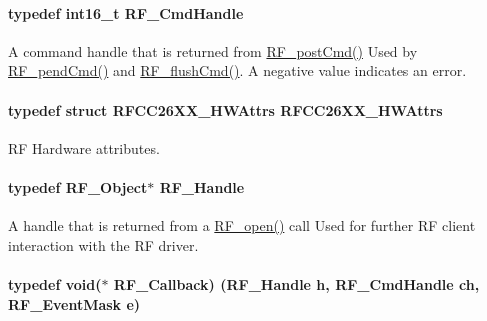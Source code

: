 \paragraph[{R\+F\+\_\+\+Cmd\+Handle}]{\setlength{\rightskip}{0pt plus 5cm}typedef int16\+\_\+t {\bf R\+F\+\_\+\+Cmd\+Handle}}\label{_r_f_8h_acab1f56c62a9fd1ad0a91a46b6da23f1}


A command handle that is returned from \hyperlink{_r_f_8h_a2b0ee444fcb74917df94eefea804ecbb}{R\+F\+\_\+post\+Cmd()} Used by \hyperlink{_r_f_8h_a91c1cb2508311f822acbc08ace568a83}{R\+F\+\_\+pend\+Cmd()} and \hyperlink{_r_f_8h_ae3ff5c614f4a63cb4e79c90f9229149a}{R\+F\+\_\+flush\+Cmd()}. A negative value indicates an error. 

\paragraph[{R\+F\+C\+C26\+X\+X\+\_\+\+H\+W\+Attrs}]{\setlength{\rightskip}{0pt plus 5cm}typedef struct {\bf R\+F\+C\+C26\+X\+X\+\_\+\+H\+W\+Attrs}  {\bf R\+F\+C\+C26\+X\+X\+\_\+\+H\+W\+Attrs}}\label{_r_f_8h_ac2049f9479d04c217097ca43ffe07c14}


R\+F Hardware attributes. 

\paragraph[{R\+F\+\_\+\+Handle}]{\setlength{\rightskip}{0pt plus 5cm}typedef {\bf R\+F\+\_\+\+Object}$\ast$ {\bf R\+F\+\_\+\+Handle}}\label{_r_f_8h_a5e8ab7fc87fb818f435d9b6226ee573f}


A handle that is returned from a \hyperlink{_r_f_8h_a13a7c6f5a2b797e0aac18fecfaba6f64}{R\+F\+\_\+open()} call Used for further R\+F client interaction with the R\+F driver. 

\paragraph[{R\+F\+\_\+\+Callback}]{\setlength{\rightskip}{0pt plus 5cm}typedef void($\ast$ R\+F\+\_\+\+Callback) ({\bf R\+F\+\_\+\+Handle} h, {\bf R\+F\+\_\+\+Cmd\+Handle} ch, {\bf R\+F\+\_\+\+Event\+Mask} e)}\label{_r_f_8h_a4d2ce6dc70b0f329dc5e249ec10c574a}


